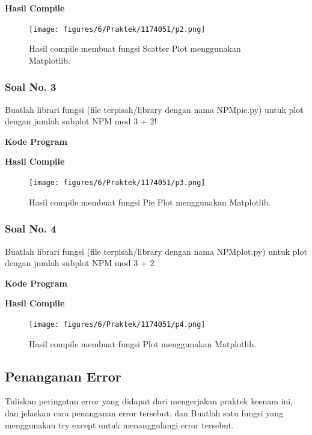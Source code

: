 \hfill \break
\textbf{Hasil Compile}

\begin{figure}[H]
	\texttt{[image: figures/6/Praktek/1174051/p2.png]}
	\centering
	\caption{Hasil compile membuat fungsi Scatter Plot menggunakan Matplotlib.}
\end{figure}

\subsubsection{Soal No. 3}
\hfill \break
Buatlah librari fungsi (file terpisah/library dengan nama NPMpie.py) untuk plot dengan jumlah subplot NPM mod 3 + 2!

\hfill \break
\textbf{Kode Program}



\hfill \break
\textbf{Hasil Compile}

\begin{figure}[H]
	\texttt{[image: figures/6/Praktek/1174051/p3.png]}
	\centering
	\caption{Hasil compile membuat fungsi Pie Plot menggunakan Matplotlib.}
\end{figure}

\subsubsection{Soal No. 4}
\hfill \break
Buatlah librari fungsi (file terpisah/library dengan nama NPMplot.py) untuk plot dengan jumlah subplot NPM mod 3 + 2

\hfill \break
\textbf{Kode Program}



\hfill \break
\textbf{Hasil Compile}

\begin{figure}[H]
	\texttt{[image: figures/6/Praktek/1174051/p4.png]}
	\centering
	\caption{Hasil compile membuat fungsi Plot menggunakan Matplotlib.}
\end{figure}


\subsection{Penanganan Error}
Tuliskan  peringatan  error  yang  didapat  dari  mengerjakan  praktek  keenam  ini, dan  jelaskan  cara  penanganan  error  tersebut. dan  Buatlah  satu  fungsi  yang menggunakan try except untuk menanggulangi error tersebut.


